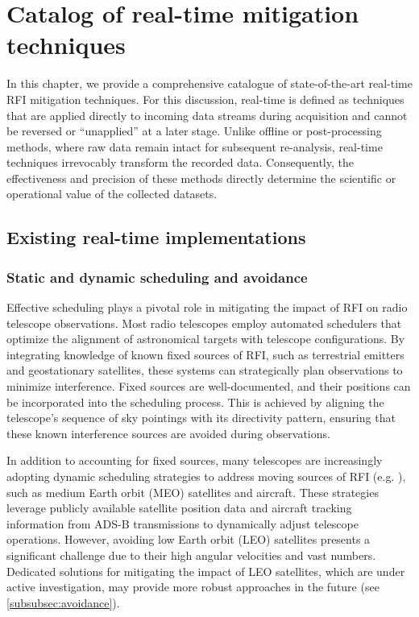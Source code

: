\section{Catalog of real-time mitigation techniques}
\label{section:hardware:catalog}

In this chapter, we provide a comprehensive catalogue of state-of-the-art real-time RFI mitigation techniques. For this discussion, real-time is defined as techniques that are applied directly to incoming data streams during acquisition and cannot be reversed or ``unapplied'' at a later stage. Unlike offline or post-processing methods, where raw data remain intact for subsequent re-analysis, real-time techniques irrevocably transform the recorded data. Consequently, the effectiveness and precision of these methods directly determine the scientific or operational value of the collected datasets.

\subsection{Existing real-time implementations}
\label{subsection:hardware:catalog:existing}
\subsubsection{Static and dynamic scheduling and avoidance}
Effective scheduling plays a pivotal role in mitigating the impact of RFI on radio telescope observations. Most radio telescopes employ automated schedulers that optimize the alignment of astronomical targets with telescope configurations. By integrating knowledge of known fixed sources of RFI, such as terrestrial emitters and geostationary satellites, these systems can strategically plan observations to minimize interference. Fixed sources are well-documented, and their positions can be incorporated into the scheduling process. This is achieved by aligning the telescope's sequence of sky pointings with its directivity pattern, ensuring that these known interference sources are avoided during observations.

In addition to accounting for fixed sources, many telescopes are increasingly adopting dynamic scheduling strategies to address moving sources of RFI (e.g. \cite{guzman2016status,luo2018cost}), such as medium Earth orbit (MEO) satellites and aircraft. These strategies leverage publicly available satellite position data and aircraft tracking information from ADS-B transmissions to dynamically adjust telescope operations. However, avoiding low Earth orbit (LEO) satellites presents a significant challenge due to their high angular velocities and vast numbers. Dedicated solutions for mitigating the impact of LEO satellites, which are under active investigation, may provide more robust approaches in the future (see \ref{subsubsec:avoidance}).

